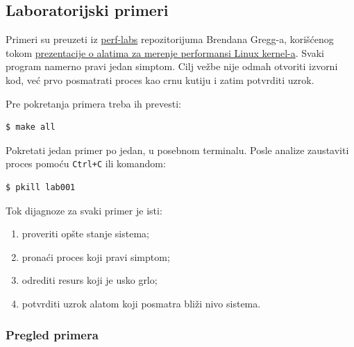 \subsection{Laboratorijski primeri}\label{dijagnoziranje-primeri}

Primeri su preuzeti iz \href{https://github.com/brendangregg/perf-labs}{perf-labs} repozitorijuma Brendana Gregg-a, korišćenog tokom \href{https://youtu.be/FJW8nGV4jxY}{prezentacije o alatima za merenje performansi Linux kernel-a}. Svaki program namerno pravi jedan simptom. Cilj vežbe nije odmah otvoriti izvorni kod, već prvo posmatrati proces kao crnu kutiju i zatim potvrditi uzrok.

Pre pokretanja primera treba ih prevesti:

\begin{verbatim}
$ make all
\end{verbatim}

Pokretati jedan primer po jedan, u posebnom terminalu. Posle analize zaustaviti proces pomoću \texttt{Ctrl+C} ili komandom:

\begin{verbatim}
$ pkill lab001
\end{verbatim}

Tok dijagnoze za svaki primer je isti:

\begin{enumerate}
\tightlist
\item
  proveriti opšte stanje sistema;
\item
  pronaći proces koji pravi simptom;
\item
  odrediti resurs koji je usko grlo;
\item
  potvrditi uzrok alatom koji posmatra bliži nivo sistema.
\end{enumerate}

\subsubsection{Pregled primera}\label{dijagnoziranje-labs-pregled}

